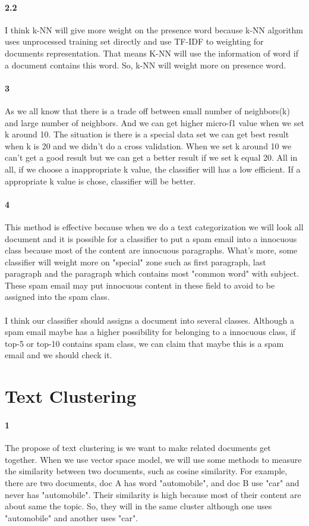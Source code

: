 \documentclass{article}
\begin{document}
		\paragraph{2.2}
		I think k-NN will give more weight on the presence word because k-NN algorithm uses unprocessed training set directly and use TF-IDF to weighting for documents representation. That means K-NN will use the information of word if a document contains this word. So, k-NN will weight more on presence word.
		\paragraph{3}
		As we all know that there is a trade off between small number of neighbors(k) and large number of neighbors. And we can get higher micro-f1 value when we set k around 10. The situation is there is a special data set we can get best result when k is 20 and we didn't do a cross validation. When we set k around 10 we can't get a good result but we can get a better result if we set k equal 20. All in all, if we choose a inappropriate k value, the classifier will has a low efficient. If a appropriate k value is chose, classifier will be better.
		\paragraph{4}
		This method is effective because when we do a text categorization we will look all document and it is possible for a classifier to put a spam email into a innocuous class because most of the content are innocuous paragraphs. What's more, some classifier will weight more on "special" zone such as first paragraph, last paragraph and the paragraph which contains most "common word" with subject. These spam email may put innocuous content in these field to avoid to be assigned into the spam class. \\ \\ 
		I think our classifier should assigns a document into several classes. Although a spam email maybe has a higher possibility for belonging to a innocuous class, if top-5 or top-10 contains spam class, we can claim that maybe this is a spam email and we should check it.
		\section{Text Clustering}
		\paragraph{1}
		The propose of text clustering is we want to make related documents get together. When we use vector space model, we will use some methods to measure the similarity between two documents, such as cosine similarity. For example, there are two documents, doc A has word "automobile", and doc B use "car" and never has "automobile". Their similarity is high because most of their content are about same the topic. So, they will in the same cluster although one uses "automobile" and another uses "car".
\end{document}
